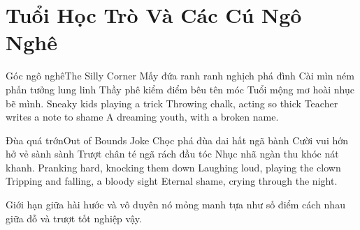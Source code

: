 \chapter{Tuổi Học Trò Và Các Cú Ngô Nghê}

\begin{tutuyetbox}{Góc ngô nghê}{The Silly Corner}
Mấy đứa ranh ranh nghịch phá đình
Cài mìn ném phấn tưởng lung linh
Thầy phê kiểm điểm bêu tên móc
Tuổi mộng mơ hoài nhục bẽ mình.
\tcblower
Sneaky kids playing a trick 
Throwing chalk, acting so thick 
Teacher writes a note to shame 
A dreaming youth, with a broken name.
\end{tutuyetbox}

\begin{tutuyetbox}{Đùa quá trớn}{Out of Bounds Joke}
Chọc phá đùa dai hất ngã bành
Cười vui hớn hở vẻ sành sành
Trượt chân té ngã rách đầu tóc
Nhục nhã ngàn thu khóc nát khanh.
\tcblower
Pranking hard, knocking them down 
Laughing loud, playing the clown 
Tripping and falling, a bloody sight 
Eternal shame, crying through the night.
\end{tutuyetbox}

\begin{ghichu}
Giới hạn giữa hài hước và vô duyên nó mỏng manh tựa như số điểm cách nhau giữa đỗ và trượt tốt nghiệp vậy.
\end{ghichu}